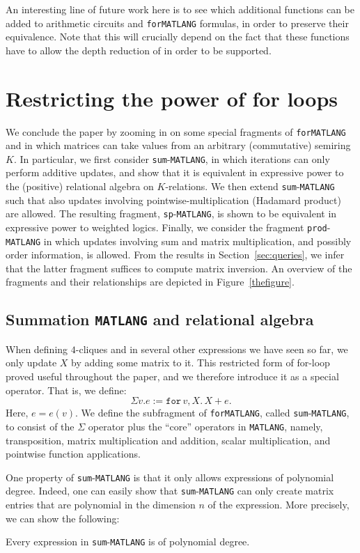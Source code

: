 \documentclass[sigconf]{acmart}
\newcommand{\lang}{\texttt{MATLANG}\xspace}
\newcommand{\langfor}{\texttt{for}\text{-}\texttt{MATLANG}\xspace}
\newcommand{\langsum}{\texttt{sum}-\texttt{MATLANG}\xspace}
\newcommand{\langprod}{\texttt{sp}-\texttt{MATLANG}\xspace}
\newcommand{\langmprod}{\texttt{prod}-\texttt{MATLANG}\xspace}
\newcommand{\ffor}[3]{\texttt{for}\, #1,#2 \texttt{.}\, #3}
\begin{document}
An interesting line of future work here is to see which additional functions can be added to arithmetic circuits and \langfor formulas, in order to preserve their equivalence. Note that this will crucially depend on the fact that these functions have to allow the depth reduction of \cite{AllenderJMV98} in order to be supported.

\section{Restricting the power of for loops}\label{sec:restrict}
We conclude the paper by zooming in on some special fragments of \langfor and in which matrices can take values from an arbitrary (commutative) semiring $K$. In particular, we first consider \langsum, in which iterations can only perform
additive updates, and show that it is equivalent in expressive power to the (positive)
relational algebra on $K$-relations. We then extend \langsum such that also updates involving pointwise-multiplication (Hadamard product) are allowed. The resulting fragment, \langprod, is shown to be equivalent in expressive power to weighted logics. Finally, we consider the fragment \langmprod in which updates involving sum and matrix multiplication, and possibly order information, is allowed. From the results in Section~\ref{sec:queries}, we infer that the latter fragment suffices to compute matrix inversion. An overview of the fragments and their relationships are depicted in Figure~\ref{thefigure}.

\subsection{Summation \lang and relational algebra}
\label{ss:sumML}
When defining $4$-cliques and in several other expressions we have seen so far, we 
 only update $X$ by adding some matrix to it. This restricted form of for-loop proved useful throughout the paper, and we therefore introduce it as a special operator. That is, we define:
$$\Sigma v. e := \ffor{v}{X}{X + e}.$$
Here, $e=e(v)$. We define the subfragment of \langfor, called \langsum, to consist of the $\Sigma$ operator plus the ``core'' operators in \lang, namely, transposition, matrix multiplication and addition, scalar multiplication, and pointwise function applications.

One property of \langsum is that it only allows expressions of polynomial degree. Indeed, one can easily show that \langsum can only create matrix entries that are polynomial in the dimension $n$ of the expression. More precisely, we can show the following:
\begin{proposition}\label{prop:poly}
Every expression in \langsum is of polynomial degree.
\end{proposition}
\end{document}

